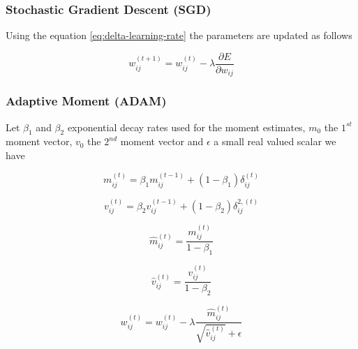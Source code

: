 \subsubsection*{Stochastic Gradient Descent (SGD)}
Using the equation \ref{eq:delta-learning-rate} the parameters are updated as follows
\begin{center}
	\begin{equation}
		w_{ij}^{(t + 1)} = w_{ij}^{(t)} - \lambda\frac{\partial{E}}{\partial{w_{ij}}} 
	\end{equation}
\end{center}

\subsubsection*{Adaptive Moment (ADAM)}
Let $\beta_1$ and $\beta_2$ exponential decay rates used for the moment estimates, $m_0$ the $1^{st}$ moment vector, $v_0$ the $2^{nd}$ moment vector and $\epsilon$ a small real valued scalar we have 
\begin{center}
	\begin{equation}
		m_{ij}^{(t)} = \beta_1m_{ij}^{(t-1)} + (1 - \beta_1)\delta_{ij}^{(t)}
	\end{equation}
\end{center}

\begin{center}
	\begin{equation}
		v_{ij}^{(t)} = \beta_2v_{ij}^{(t-1)} + (1 - \beta_2)\delta_{ij}^{2,  (t)}
	\end{equation}
\end{center}

\begin{center}
	\begin{equation}
		\hat{m}_{ij}^{(t)} = \frac{m_{ij}^{(t)}}{1 - \beta_{1}}
	\end{equation}
\end{center}

\begin{center}
	\begin{equation}
		\hat{v}_{ij}^{(t)} = \frac{v_{ij}^{(t)}}{1 - \beta_{2}}
	\end{equation}
\end{center}

\begin{center}
	\begin{equation}
		w_{ij}^{(t)} = w_{ij}^{(t)} - \lambda\frac{\hat{m}_{ij}^{(t)}}{\sqrt{\hat{v}_{ij}^{(t)}} + \epsilon}
	\end{equation}
\end{center}

